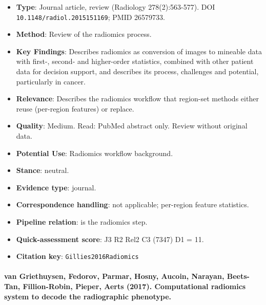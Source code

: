 \documentclass[journal,onecolumn]{IEEEtran}
\begin{document}
\begin{itemize}

\item{} \textbf{Type}: Journal article, review (Radiology 278(2):563-577). DOI \nolinkurl{10.1148/radiol.2015151169}; PMID 26579733.

\item{} \textbf{Method}: Review of the radiomics process.

\item{} \textbf{Key Findings}: Describes radiomics as conversion of images to mineable data with first-, second- and higher-order statistics, combined with other patient data for decision support, and describes its process, challenges and potential, particularly in cancer.

\item{} \textbf{Relevance}: Describes the radiomics workflow that region-set methods either reuse (per-region features) or replace.

\item{} \textbf{Quality}: Medium. Read: PubMed abstract only. Review without original data.

\item{} \textbf{Potential Use}: Radiomics workflow background.

\item{} \textbf{Stance}: neutral.

\item{} \textbf{Evidence type}: journal.

\item{} \textbf{Correspondence handling}: not applicable; per-region feature statistics.

\item{} \textbf{Pipeline relation}: is the radiomics step.

\item{} \textbf{Quick-assessment score}: J3 R2 Rel2 C3 (7347) D1 = 11.

\item{} \textbf{Citation key}: \texttt{Gillies2016Radiomics}

\end{itemize}

\paragraph{van Griethuysen, Fedorov, Parmar, Hosny, Aucoin, Narayan, Beets-Tan, Fillion-Robin, Pieper, Aerts (2017). Computational radiomics system to decode the radiographic phenotype.~\cite{vanGriethuysen2017Computational}}\mbox{}
\end{document}

